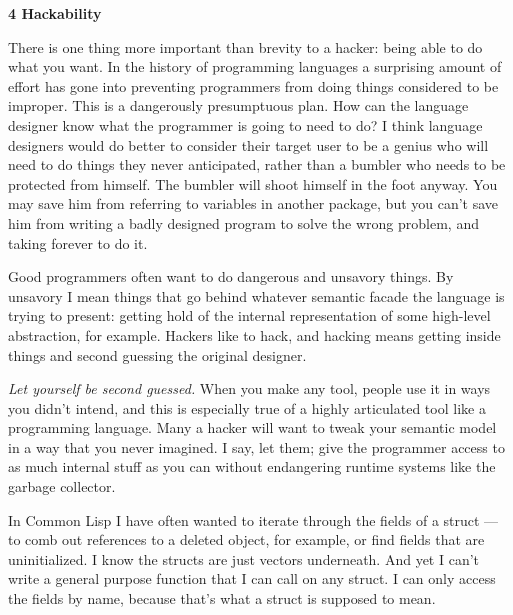 \textbf{4 Hackability}

There is one thing more important than brevity to a hacker: being able
to do what you want. In the history of programming languages a
surprising amount of effort has gone into preventing programmers from
doing things considered to be improper. This is a dangerously
presumptuous plan. How can the language designer know what the
programmer is going to need to do? I think language designers would do
better to consider their target user to be a genius who will need to do
things they never anticipated, rather than a bumbler who needs to be
protected from himself. The bumbler will shoot himself in the foot
anyway. You may save him from referring to variables in another package,
but you can't save him from writing a badly designed program to solve
the wrong problem, and taking forever to do it.

Good programmers often want to do dangerous and unsavory things. By
unsavory I mean things that go behind whatever semantic facade the
language is trying to present: getting hold of the internal
representation of some high-level abstraction, for example. Hackers like
to hack, and hacking means getting inside things and second guessing the
original designer.

\emph{Let yourself be second guessed.} When you make any tool, people
use it in ways you didn't intend, and this is especially true of a
highly articulated tool like a programming language. Many a hacker will
want to tweak your semantic model in a way that you never imagined. I
say, let them; give the programmer access to as much internal stuff as
you can without endangering runtime systems like the garbage collector.

In Common Lisp I have often wanted to iterate through the fields of a
struct --- to comb out references to a deleted object, for example, or
find fields that are uninitialized. I know the structs are just vectors
underneath. And yet I can't write a general purpose function that I can
call on any struct. I can only access the fields by name, because that's
what a struct is supposed to mean.

